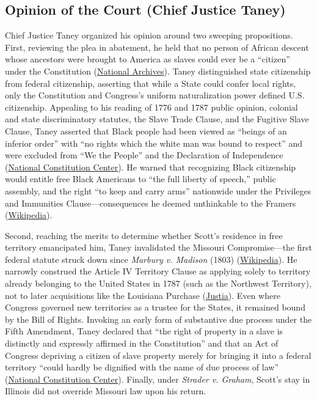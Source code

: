 \documentclass[12pt]{article}
\begin{document}
\subsection{Opinion of the Court (Chief Justice Taney)}

Chief Justice Taney organized his opinion around two sweeping propositions. First, reviewing the plea in abatement, he held that no person of African descent whose ancestors were brought to America as slaves could ever be a ``citizen'' under the Constitution (\href{https://www.archives.gov/milestone-documents/dred-scott-v-sandford}{National Archives}). Taney distinguished state citizenship from federal citizenship, asserting that while a State could confer local rights, only the Constitution and Congress's uniform naturalization power defined U.S. citizenship. Appealing to his reading of 1776 and 1787 public opinion, colonial and state discriminatory statutes, the Slave Trade Clause, and the Fugitive Slave Clause, Taney asserted that Black people had been viewed as ``beings of an inferior order'' with ``no rights which the white man was bound to respect'' and were excluded from ``We the People'' and the Declaration of Independence (\href{https://constitutioncenter.org/the-constitution/supreme-court-case-library/dred-scott-v-sandford}{National Constitution Center}). He warned that recognizing Black citizenship would entitle free Black Americans to ``the full liberty of speech,'' public assembly, and the right ``to keep and carry arms'' nationwide under the Privileges and Immunities Clause---consequences he deemed unthinkable to the Framers (\href{https://en.wikipedia.org/wiki/Dred_Scott_v._Sandford}{Wikipedia}).

Second, reaching the merits to determine whether Scott's residence in free territory emancipated him, Taney invalidated the Missouri Compromise---the first federal statute struck down since \textit{Marbury v. Madison} (1803) (\href{https://en.wikipedia.org/wiki/Dred_Scott_v._Sandford}{Wikipedia}). He narrowly construed the Article IV Territory Clause as applying solely to territory already belonging to the United States in 1787 (such as the Northwest Territory), not to later acquisitions like the Louisiana Purchase (\href{https://supreme.justia.com/cases/federal/us/60/393/}{Justia}). Even where Congress governed new territories as a trustee for the States, it remained bound by the Bill of Rights. Invoking an early form of substantive due process under the Fifth Amendment, Taney declared that ``the right of property in a slave is distinctly and expressly affirmed in the Constitution'' and that an Act of Congress depriving a citizen of slave property merely for bringing it into a federal territory ``could hardly be dignified with the name of due process of law'' (\href{https://constitutioncenter.org/the-constitution/supreme-court-case-library/dred-scott-v-sandford}{National Constitution Center}). Finally, under \textit{Strader v. Graham}, Scott's stay in Illinois did not override Missouri law upon his return.
\end{document}

